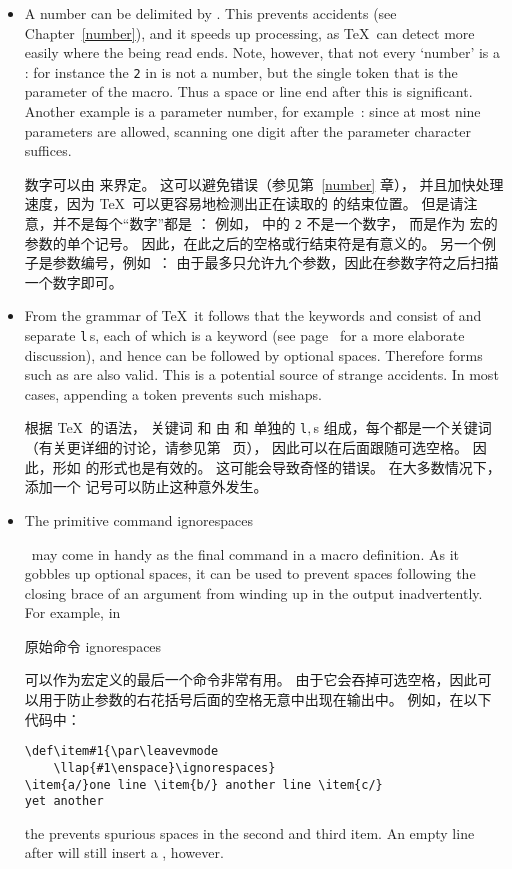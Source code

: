 \begin{itemize} 
\item A number can be delimited by . 
This prevents accidents (see Chapter~\ref{number}), 
and it speeds up processing, as \TeX\ can 
detect more easily where the  being read ends.
Note, however, that not every `number' is a :
for instance the {\tt 2} in  is not a number,
but the  single token that is the parameter of the
 macro. Thus a space or line end after this
is significant. Another example is a parameter number,
for example~: since at most nine parameters are allowed, scanning
one digit after the parameter character suffices.

数字可以由  来界定。
这可以避免错误（参见第~\ref{number} 章），
并且加快处理速度，因为 \TeX\ 可以更容易地检测出正在读取的  的结束位置。
但是请注意，并不是每个“数字”都是 ：
例如， 中的 {\tt 2} 不是一个数字，
而是作为  宏的参数的单个记号。
因此，在此之后的空格或行结束符是有意义的。
另一个例子是参数编号，例如~：
由于最多只允许九个参数，因此在参数字符之后扫描一个数字即可。

\item From the grammar of \TeX\ 
it follows that the
keywords  and 
consist of  and
separate {\tt l}$\,$s, each of which is a keyword
(see page~\pageref{keywords} for a more elaborate discussion),
and hence can be followed by optional spaces. 
Therefore forms such as \hbox{} are also valid.
This is a potential source of strange accidents.
In most cases, appending a  token prevents
such mishaps.

根据 \TeX\ 的语法，
关键词  和  由  和
单独的 {\tt l}$,$s 组成，每个都是一个关键词
（有关更详细的讨论，请参见第~\pageref{keywords} 页），
因此可以在后面跟随可选空格。
因此，形如 \hbox{} 的形式也是有效的。
这可能会导致奇怪的错误。
在大多数情况下，添加一个  记号可以防止这种意外发生。
\item The primitive command \cstoidx ignorespaces\par\ 
may come in handy as the final command in a macro definition.
As it gobbles up
optional spaces, it can be used to prevent spaces following the
closing brace of an argument from winding up in the output
inadvertently. For example, in

原始命令 \cstoidx ignorespaces\par
可以作为宏定义的最后一个命令非常有用。
由于它会吞掉可选空格，因此可以用于防止参数的右花括号后面的空格无意中出现在输出中。
例如，在以下代码中：
\begin{verbatim}
\def\item#1{\par\leavevmode
    \llap{#1\enspace}\ignorespaces}
\item{a/}one line \item{b/} another line \item{c/}
yet another
\end{verbatim} 
the  prevents spurious
spaces in the second and third item.
An empty line
after \cs{ignorespaces} will still insert a , however.


\end{itemize}

